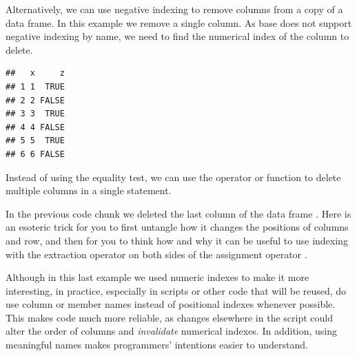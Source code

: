 \documentclass[krantz2]{krantz}\usepackage{knitr}
\begin{document}
\begin{explainbox}
Alternatively, we can use negative indexing to remove columns from a copy of a data frame. In this example we remove a single column. As base \Rlang does not support negative indexing by name, we need to find the numerical index of the column to delete.

\begin{knitrout}\footnotesize
{}\color{fgcolor}\begin{kframe}
\begin{alltt}
\hlstd{a.df[ ,} \hlopt{-}\hlstd{(} \hlopt{==} \hlstd{)]}
\end{alltt}
\begin{verbatim}
##   x     z
## 1 1  TRUE
## 2 2 FALSE
## 3 3  TRUE
## 4 4 FALSE
## 5 5  TRUE
## 6 6 FALSE
\end{verbatim}
\end{kframe}
\end{knitrout}
Instead of using the equality test, we can use the operator  or function  to delete multiple columns in a single statement.
\end{explainbox}

\begin{playground}
In the previous code chunk we deleted the last column of the data frame .
Here is an esoteric trick for you to first untangle how it changes the positions of columns and row, and then for you to think how and why it can be useful to use indexing with the extraction operator \Roperator{[ ]} on both sides of the assignment operator \Roperator{<-}.

\begin{knitrout}\footnotesize
{}\color{fgcolor}\begin{kframe}
\begin{alltt}
\hlstd{a.df[}\hlopt{:}\hlstd{,} \hlstd{(}\hlstd{,}\hlstd{)]} \hlkwb{<-} \hlstd{a.df[}\hlopt{:}\hlstd{,} \hlstd{(}\hlstd{,}\hlstd{)]}
\end{alltt}
\end{kframe}
\end{knitrout}
\end{playground}

\begin{warningbox}
Although in this last example we used numeric indexes to make it more interesting, in practice, especially in scripts or other code that will be reused, do use column or member names instead of positional indexes whenever possible. This makes code much more reliable, as changes elsewhere in the script could alter the order of columns and \emph{invalidate} numerical indexes. In addition, using meaningful names makes programmers' intentions easier to understand.
\end{warningbox}
\end{document}
